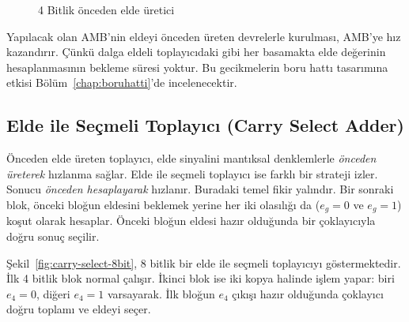 \begin{figure}[htbp]
\caption{4 Bitlik {\"o}nceden elde {\"u}retici}
\label{fig:4bit-onceden-elde}
\end{figure}

Yapılacak olan AMB'nin eldeyi önceden üreten devrelerle kurulması, AMB'ye hız kazandırır. Çünkü dalga eldeli toplayıcıdaki gibi her basamakta elde değerinin hesaplanmasının bekleme süresi yoktur. Bu gecikmelerin boru hattı tasarımına etkisi Bölüm~\ref{chap:boruhatti}'de incelenecektir.

\subsection{Elde ile Seçmeli Toplayıcı (Carry Select Adder)}
\label{sec:carry-select}

Önceden elde üreten toplayıcı, elde sinyalini mantıksal denklemlerle \emph{önceden üreterek} hızlanma sağlar. Elde ile seçmeli toplayıcı ise farklı bir strateji izler. Sonucu \emph{önceden hesaplayarak} hızlanır. Buradaki temel fikir yalındır. Bir sonraki blok, önceki bloğun eldesini beklemek yerine her iki olasılığı da ($e_{g} = 0$ ve $e_{g} = 1$) koşut olarak hesaplar. Önceki bloğun eldesi hazır olduğunda bir çoklayıcıyla doğru sonuç seçilir.

Şekil~\ref{fig:carry-select-8bit}, 8 bitlik bir elde ile seçmeli toplayıcıyı göstermektedir. İlk 4 bitlik blok normal çalışır. İkinci blok ise iki kopya halinde işlem yapar: biri $e_4 = 0$, diğeri $e_4 = 1$ varsayarak. İlk bloğun $e_4$ çıkışı hazır olduğunda çoklayıcı doğru toplamı ve eldeyi seçer.

